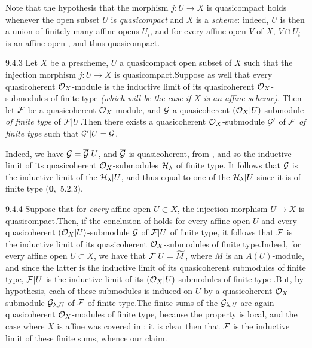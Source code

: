 \documentclass[../main.tex]{subfiles}
\begin{document}
Note that the hypothesis that the morphism $j\colon U\to X$ is quasicompact
holds whenever the open subset $U$ is \emph{quasicompact} and $X$ is a
\emph{scheme}: indeed, $U$ is then a union of finitely-many affine opens $U_i$,
and for every affine open $V$ of $X$, $V\cap U_i$ is an affine open , and
thus quasicompact.
 
\begin{env}[Corollary]{9.4.3}
Let $X$ be a prescheme, $U$ a quasicompact open
subset of $X$ such that the injection morphism $j\colon U\to X$ is
quasicompact.Suppose as well that every quasicoherent $\mathcal{O}_X$-module is the
inductive limit of its quasicoherent $\mathcal{O}_X$-submodules of finite type
\emph{(which will be the case if $X$ is an \emph{affine scheme})}. Then let
$\mathcal{F}$ be a quasicoherent $\mathcal{O}_X$-module, and $\mathcal{G}$ a quasicoherent
$(\mathcal{O}_X|U)$-submodule \emph{of finite type} of $\mathcal{F}|U$.Then there exists
a quasicoherent $\mathcal{O}_X$-submodule $\mathcal{G}'$ of $\mathcal{F}$ \emph{of finite
type} such that $\mathcal{G}'|U=\mathcal{G}$.
\end{env}
 
Indeed, we have $\mathcal{G}=\overline{\mathcal{G}}|U$, and $\overline{\mathcal{G}}$
is quasicoherent, from , and so the inductive limit of its
quasicoherent $\mathcal{O}_X$-submodules $\mathcal{H}_\lambda$ of finite type. It
follows that $\mathcal{G}$ is the inductive limit of the $\mathcal{H}_\lambda|U$,
and thus equal to one of the $\mathcal{H}_\lambda|U$ since it is of finite type
(\textbf{0},~5.2.3).
 
\begin{env}[Remark]{9.4.4}
Suppose that for \emph{every} affine open $U\subset
X$, the injection morphism $U\to X$ is quasicompact.Then, if the conclusion
of  holds for every affine open $U$ and every quasicoherent
$(\mathcal{O}_X|U)$-submodule $\mathcal{G}$ of $\mathcal{F}|U$ of finite type, it
follows that $\mathcal{F}$ is the inductive limit of its
quasicoherent $\mathcal{O}_X$-submodules of finite type.Indeed, for every affine open
$U\subset X$, we have that $\mathcal{F}|U=\widetilde{M}$, where $M$ is an
$A(U)$-module, and since the latter is the inductive limit of its quasicoherent
submodules of finite type, $\mathcal{F}|U$ is the inductive limit of its
$(\mathcal{O}_X|U)$-submodules of finite type .But, by hypothesis, each of
these submodules is induced on $U$ by a quasicoherent $\mathcal{O}_X$-submodule
$\mathcal{G}_{\lambda,U}$ of $\mathcal{F}$ of finite type.The finite sums of the
$\mathcal{G}_{\lambda,U}$ are again quasicoherent $\mathcal{O}_X$-modules of finite type,
because the property is local, and the case where $X$ is affine was covered in
; it is clear then that $\mathcal{F}$ is the inductive limit of these
finite sums, whence our claim.
\end{env}
 
\end{document}
